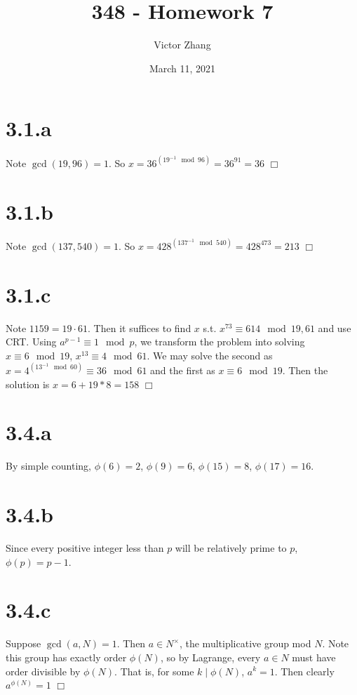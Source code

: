 \documentclass{article}
\title{348 - Homework 7}
\author{Victor Zhang}
\date{March 11, 2021}
\begin{document}
\maketitle

\section*{3.1.a}
Note $\gcd(19,96) = 1$. So $x = 36^{(19^{-1} \mod 96)} = 36^{91} = 36$ $\Box$

\section*{3.1.b}
Note $\gcd(137,540) = 1$. So $x = 428^{(137^{-1} \mod 540)} = 428^{473} = 213$ $\Box$

\section*{3.1.c}
Note $1159 = 19\cdot61$. Then it suffices to find $x$ s.t. $x^{73} \equiv 614 \mod 19,61$ and use CRT. Using $a^{p-1} \equiv 1 \mod p$, we transform the problem into solving $x \equiv 6 \mod 19$, $x^{13} \equiv 4 \mod 61$. We may solve the second as $x = 4^{(13^{-1}\mod 60)} \equiv 36 \mod 61$ and the first as $x \equiv 6 \mod 19$. Then the solution is $x = 6 + 19*8 = 158$ $\Box$

\section*{3.4.a}
By simple counting, $\phi(6) = 2$, $\phi(9) = 6$, $\phi(15) = 8$, $\phi(17) = 16$.

\section*{3.4.b}
Since every positive integer less than $p$ will be relatively prime to $p$, $\phi(p) = p-1$. 

\section*{3.4.c}
Suppose $\gcd(a,N) = 1$. Then $a \in N^\times$, the multiplicative group mod $N$. Note this group has exactly order $\phi(N)$, so by Lagrange, every $a \in N$ must have order divisible by $\phi(N)$. That is, for some $k \;\vert\; \phi(N)$, $a^k = 1$. Then clearly $a^{\phi(N)} = 1$ $\Box$
\end{document}

